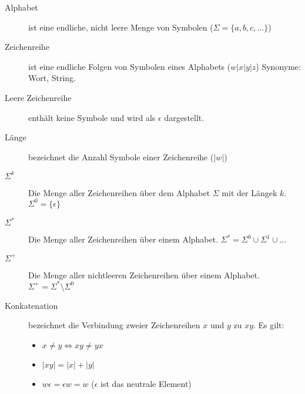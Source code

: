 \begin{description}
	\item [Alphabet]
	ist eine endliche, nicht leere Menge von Symbolen ($\Sigma = \{a, b, c, \dots\}$)

	\item [Zeichenreihe] 
	ist eine endliche Folgen von Symbolen eines Alphabets ($w|x|y|z$) Synonyme: Wort, String.

	\item [Leere Zeichenreihe] enthält keine Symbole und wird als $\epsilon$ dargestellt.

	\item [Länge] bezeichnet die Anzahl Symbole einer Zeichenreihe ($|w|$)

	\item [$\Sigma^k$] Die Menge aller Zeichenreihen über dem Alphabet $\Sigma$ mit der Längek $k$. $\Sigma^0 = \{\epsilon\}$

	\item [$\Sigma^*$] Die Menge aller Zeichenreihen über einem Alphabet. $\Sigma^* = \Sigma^0 \cup \Sigma^1 \cup \dots$

	\item [$\Sigma^+$] Die Menge aller nichtleeren Zeichenreihen über einem Alphabet. $\Sigma^+ = \Sigma^* \setminus \Sigma^0$

	\item [Konkatenation] 
	bezeichnet die Verbindung zweier Zeichenreihen $x$ und $y$ zu $xy$.
	Es gilt:
	\begin{itemize}\itemsep0em
		\item $x \neq y \Leftrightarrow xy \neq yx$
		\item $|xy| = |x| + |y|$
		\item $w\epsilon = \epsilon w = w$ ($\epsilon$ ist das neutrale Element)
	\end{itemize}


\end{description}
